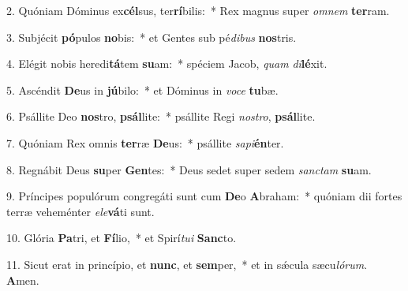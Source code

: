 2. Quóniam Dóminus ex\textbf{cél}sus, ter\textbf{rí}bilis:~*  Rex magnus super \textit{om}\textit{nem} \textbf{ter}ram.\

3. Subjécit \textbf{pó}pulos \textbf{no}bis:~*  et Gentes sub pé\textit{di}\textit{bus} \textbf{nos}tris.\

4. Elégit nobis heredi\textbf{tá}tem \textbf{su}am:~*  spéciem Jacob, \textit{quam} \textit{di}\textbf{lé}xit.\

5. Ascéndit \textbf{De}us in \textbf{jú}bilo:~*  et Dóminus in \textit{vo}\textit{ce} \textbf{tu}bæ.\

6. Psállite Deo \textbf{nos}tro, \textbf{psál}lite:~*  psállite Regi \textit{nos}\textit{tro}, \textbf{psál}lite.\

7. Quóniam Rex omnis \textbf{ter}ræ \textbf{De}us:~*  psállite \textit{sa}\textit{pi}\textbf{én}ter.\

8. Regnábit Deus \textbf{su}per \textbf{Gen}tes:~*  Deus sedet super sedem \textit{sanc}\textit{tam} \textbf{su}am.\

9. Príncipes populórum congregáti sunt cum \textbf{De}o \textbf{A}braham:~*  quóniam dii fortes terræ veheménter \textit{e}\textit{le}\textbf{vá}ti sunt.\

10. Glória \textbf{Pa}tri, et \textbf{Fí}lio,~*  et Spirí\textit{tu}\textit{i} \textbf{Sanc}to.\

11. Sicut erat in princípio, et \textbf{nunc}, et \textbf{sem}per,~*  et in sǽcula sæcu\textit{ló}\textit{rum}. \textbf{A}men.\

